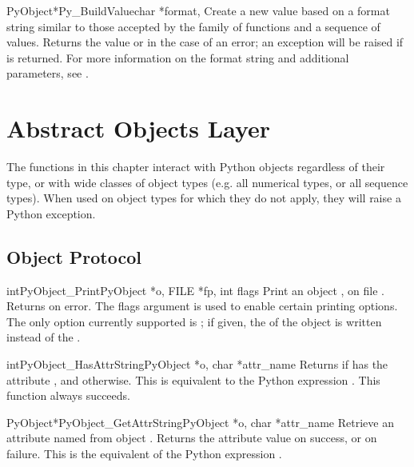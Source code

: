 \documentclass{manual}
\begin{document}
\begin{cfuncdesc}{PyObject*}{Py_BuildValue}{char *format,
                                            \moreargs}
  Create a new value based on a format string similar to those
  accepted by the  family of functions and a
  sequence of values.  Returns the value or \NULL{} in the case of an
  error; an exception will be raised if \NULL{} is returned.  For more
  information on the format string and additional parameters, see
  .
\end{cfuncdesc}



\chapter{Abstract Objects Layer \label{abstract}}

The functions in this chapter interact with Python objects regardless
of their type, or with wide classes of object types (e.g. all
numerical types, or all sequence types).  When used on object types
for which they do not apply, they will raise a Python exception.

\section{Object Protocol \label{object}}

\begin{cfuncdesc}{int}{PyObject_Print}{PyObject *o, FILE *fp, int flags}
Print an object , on file .  Returns  on error.
The flags argument is used to enable certain printing options.  The
only option currently supported is ; if given,
the  of the object is written instead of the
.
\end{cfuncdesc}

\begin{cfuncdesc}{int}{PyObject_HasAttrString}{PyObject *o, char *attr_name}
Returns  if  has the attribute , and
 otherwise.  This is equivalent to the Python expression
.
This function always succeeds.
\end{cfuncdesc}

\begin{cfuncdesc}{PyObject*}{PyObject_GetAttrString}{PyObject *o,
                                                     char *attr_name}
Retrieve an attribute named  from object .
Returns the attribute value on success, or \NULL{} on failure.
This is the equivalent of the Python expression
.
\end{cfuncdesc}
\end{document}
